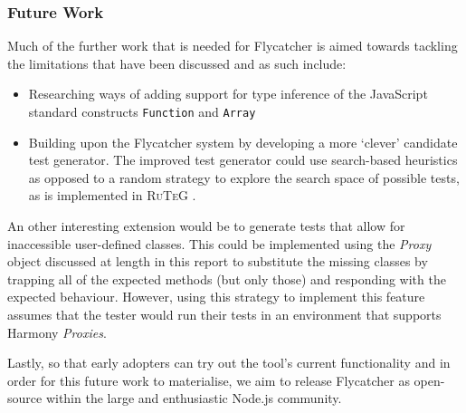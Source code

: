 \subsubsection{Future Work}

Much of the further work that is needed for \textsf{Flycatcher} is aimed towards tackling the limitations that have been discussed and as such include:

\begin{itemize}
   \item Researching ways of adding support for type inference of the JavaScript standard constructs \texttt{Function} and \texttt{Array}
   \item Building upon the \textsf{Flycatcher} system by developing a more `clever' candidate test generator. The improved test generator could use search-based heuristics as opposed to a random strategy to explore the search space of possible tests, as is implemented in \textsc{RuTeG} \cite{mairhofer2008search}.
\end{itemize}

An other interesting extension would be to generate tests that allow for inaccessible user-defined classes. This could be implemented using the \emph{Proxy} object discussed at length in this report to substitute the missing classes by trapping all of the expected methods (but only those) and responding with the expected behaviour. However, using this strategy to implement this feature assumes that the tester would run their tests in an environment that supports Harmony \emph{Proxies}.

Lastly, so that early adopters can try out the tool's current functionality and in order for this future work to materialise, we aim to release \textsf{Flycatcher} as open-source within the large and enthusiastic \textsf{Node.js} community.




